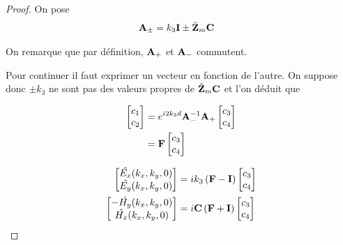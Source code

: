 \begin{proof}
            On pose
            \begin{align}
                \mathbf{A}_\pm &= k_3\mathbf{I} \pm \hat{\mathbf{Z}}_m\mathbf{C}
            \end{align}

            On remarque que par définition, \(\mathbf{A}_+\) et \(\mathbf{A}_-\) commutent.

            Pour continuer il faut exprimer un vecteur en fonction de l'autre. On suppose donc \(\pm k_3\) ne sont pas des valeurs propres de \(\hat{\mathbf{Z}}_m\mathbf{C}\) et l'on déduit que

            \begin{align}
                \begin{bmatrix}
                    c_1 \\
                    c_2
                \end{bmatrix}
                &= e^{i2 k_3 d} \mathbf{A}_-^{-1}\mathbf{A}_+
                \begin{bmatrix}
                    c_3 \\
                    c_4
                \end{bmatrix}
                \\
                & = \mathbf{F}
                \begin{bmatrix}
                    c_3 \\
                    c_4
                \end{bmatrix}
            \end{align}

            \begin{align}
                \begin{bmatrix}
                    \hat{E_x}(k_x,k_y,0)\\
                    \hat{E_y}(k_x,k_y,0)\\
                \end{bmatrix}
                &=ik_3\left(\mathbf{F} - \mathbf{I} \right)
                \begin{bmatrix}
                    c_3 \\
                    c_4
                \end{bmatrix}\\
                \begin{bmatrix}
                    -\hat{H_y}(k_x,k_y,0)\\
                    \hat{H_x}(k_x,k_y,0)\\
                \end{bmatrix}
                &=i\mathbf{C} \left(\mathbf{F} + \mathbf{I} \right)
                \begin{bmatrix}
                        c_3 \\
                        c_4
                \end{bmatrix}
            \end{align}


\end{proof}

